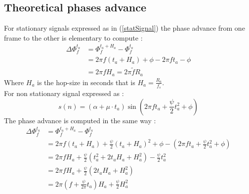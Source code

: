 \documentclass[]{article}
\begin{document}
\subsection{Theoretical phases advance}\label{theoretical_phase_advance}
For stationary signals expressed as in (\ref{statSignal}) the phase advance from one frame to the other is elementary to compute :
\begin{equation}\label{phaseAdvanceStat}
\begin{split}
\Delta \Phi_{f}^{t_a} & = \Phi_{f}^{t_a + H_a} - \Phi_{f}^{t_a}\\
& = 2\pi f (t_a + H_a) + \phi - 2\pi f t_a - \phi\\
& = 2\pi f H_a = 2\pi \tilde{f} R_a
\end{split}
\end{equation}
Where $H_a$ is the hop-size in seconds that is $H_a = \frac{R_a}{f_s}$.\\
For non stationary signal expressed as :
\begin{equation}
s(n) = (\alpha + \mu \cdot t_a) \sin(2\pi f t_a + \frac{\psi}{2} t_a^2 + \phi)
\end{equation}
The phase advance is computed in the same way :
\begin{equation}
\begin{split}
\Delta \Phi_{f}^{t_a} & = \Phi_{f}^{t_a + H_a} - \Phi_{f}^{t_a}\\
& = 2\pi f (t_a + H_a) + \frac{\psi}{2} (t_a + H_a)^2 + \phi - (2\pi f t_a + \frac{\psi}{2} t_a^2 + \phi)\\
& = 2\pi f H_a + \frac{\psi}{2}(t_a^2 + 2 t_a H_a + H_a^2) - \frac{\psi}{2} t_a^2\\
& = 2\pi f H_a + \frac{\psi}{2}(2 t_a H_a + H_a^2)\\
& = 2\pi (f + \frac{\psi}{2\pi}t_a)H_a + \frac{\psi}{2}H_a^2
\end{split}
\end{equation}
\newpage


\end{document}
